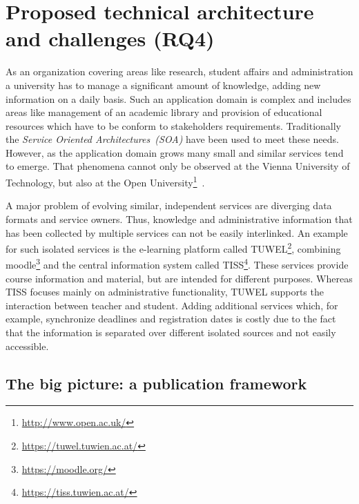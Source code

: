 \section{Proposed technical architecture and challenges (RQ4)}
As an organization covering areas like research, student affairs and administration a university has to manage a significant amount of knowledge, adding new information on a daily basis.
Such an application domain is complex and includes areas like management of an academic library and provision of educational resources which have to be conform to stakeholders requirements. Traditionally the \textit{Service Oriented Architectures~(SOA)} have been used to meet these needs. However, as the application domain grows many small and similar services tend to emerge. That phenomena cannot only be observed at the Vienna University of Technology, but also at the Open University\footnote{\url{http://www.open.ac.uk/}}~\citet{inproceedings:zablith_consuming_2011}.

A major problem of evolving similar, independent services are diverging data formats and service owners. Thus, knowledge and administrative information that has been collected by multiple services can not be easily interlinked. An example for such isolated services is the e-learning platform called TUWEL\footnote{\url{https://tuwel.tuwien.ac.at/}}, combining moodle\footnote{\url{https://moodle.org/}} and the central information system called TISS\footnote{\url{https://tiss.tuwien.ac.at/}}. These services provide course information and material, but are intended for different purposes. Whereas TISS focuses mainly on administrative functionality, TUWEL supports the interaction between teacher and student. 
Adding additional services which, for example, synchronize deadlines and registration dates is costly due to the fact that the information is separated over different isolated sources and not easily accessible. 

\subsection{The big picture: a publication framework}

